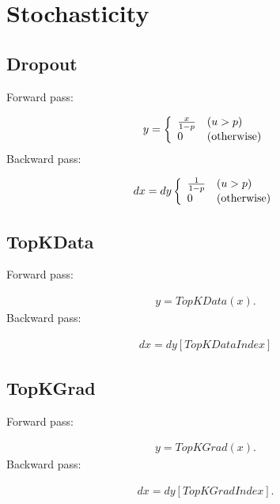 \documentclass{article}
\begin{document}
\section{Stochasticity}
\label{sec:Stochasticity}

\subsection{Dropout}

Forward pass:

\begin{eqnarray}
  y = \left\{
  \begin{array}{ll}
    \frac{x}{1 - p} & (u > p) \\
    0 & ({\rm {\rm otherwise}})
  \end{array} \right.
\end{eqnarray}
%
Backward pass:

\begin{eqnarray}
  dx = dy \left\{
  \begin{array}{ll}
    \frac{1}{1 - p} & (u > p) \\
    0 & ({\rm {\rm otherwise}})
  \end{array} \right.
\end{eqnarray}


\subsection{TopKData}

Forward pass:

\begin{eqnarray}
  y = TopKData(x).
\end{eqnarray}
%
Backward pass:

\begin{eqnarray}
  dx = dy[TopKDataIndex]
\end{eqnarray}


\subsection{TopKGrad}

Forward pass:

\begin{eqnarray}
  y = TopKGrad(x).
\end{eqnarray}
%
Backward pass:

\begin{eqnarray}
  dx = dy[TopKGradIndex].
\end{eqnarray}
\end{document}

